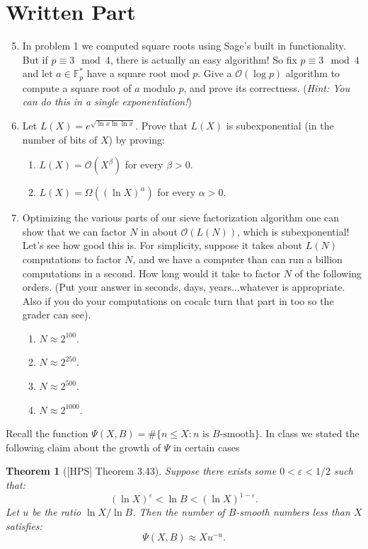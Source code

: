 \documentclass[11pt]{article}
\newtheorem{theorem}{Theorem}
\newcommand{\bF}{\mathbb{F}}
\newcommand{\cO}{\mathcal{O}}
\begin{document}
\section*{Written Part}
\begin{enumerate}
  \setcounter{enumi}{4}
  \item{
  In problem 1 we computed square roots using Sage's built in functionality.  But if $p\equiv 3\mod 4$, there is actually an easy algorithm!  So fix $p\equiv 3\mod 4$ and let $a\in\bF_p^*$ have a square root mod $p$.  Give a $\cO(\log p)$ algorithm to compute a square root of $a$ modulo $p$, and prove its correctness.  (\textit{Hint: You can do this in a single exponentiation!})
  }
  \item{
  Let $L(X) = e^{\sqrt{\ln x\ln\ln x}}$.  Prove that $L(X)$ is subexponential (in the number of bits of $X$) by proving:
  \begin{enumerate}
    \item{
    $L(X) = \cO(X^\beta)$ for every $\beta>0$.
    }
    \item{
    $L(X) = \Omega((\ln X)^\alpha)$ for every $\alpha>0$.
    }
  \end{enumerate}
  }
  \item{
  Optimizing the various parts of our sieve factorization algorithm one can show that we can factor $N$ in about $\cO(L(N))$, which is subexponential!  Let's see how good this is.  For simplicity, suppose it takes about $L(N)$ computations to factor $N$, and we have a computer than can run a billion computations in a second.  How long would it take to factor $N$ of the following orders.  (Put your answer in seconds, days, years...whatever is appropriate.  Also if you do your computations on cocalc turn that part in too so the grader can see).
  \begin{enumerate}
    \item{$N\approx 2^{100}$.}
    \item{$N\approx 2^{250}$.}
    \item{$N\approx 2^{500}$.}
    \item{$N\approx 2^{1000}$.}
  \end{enumerate}
  }
\end{enumerate}
Recall the function $\Psi(X,B) =\#\{n\le X:n\text{ is }B\text{-smooth}\}.$  In class we stated the following claim about the growth of $\Psi$ in certain cases
\begin{theorem}[{[HPS] Theorem 3.43}]\label{TechnicalBit}
  Suppose there exists some $0<\varepsilon<1/2$ such that:
  \[(\ln X)^{\varepsilon} < \ln B < (\ln X)^{1-\varepsilon}.\]
  Let $u$ be the ratio $\ln X/\ln B$.  Then the number of $B$-smooth numbers less than $X$ satisfies:
  \[\Psi(X,B)\approx X u^{-u}.\]
\end{theorem}
\end{document}
